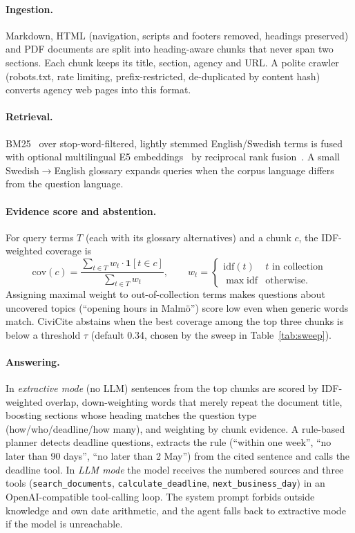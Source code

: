 \documentclass[11pt,a4paper]{article}
\begin{document}
\paragraph{Ingestion.} Markdown, HTML (navigation, scripts and footers removed, headings preserved) and PDF
documents are split into heading-aware chunks that never span two sections. Each chunk keeps its title,
section, agency and URL. A polite crawler (robots.txt, rate limiting, prefix-restricted, de-duplicated by
content hash) converts agency web pages into this format.

\paragraph{Retrieval.} BM25~\cite{bm25} over stop-word-filtered, lightly stemmed English/Swedish terms
is fused with optional multilingual E5 embeddings~\cite{e5} by reciprocal rank fusion~\cite{rrf}. A small
Swedish$\to$English glossary expands queries when the corpus language differs from the question language.

\paragraph{Evidence score and abstention.} For query terms $T$ (each with its glossary alternatives) and a
chunk $c$, the IDF-weighted coverage is
\[
  \mathrm{cov}(c) = \frac{\sum_{t \in T} w_t \cdot \mathbf{1}[t \in c]}{\sum_{t \in T} w_t}, \qquad
  w_t = \begin{cases} \mathrm{idf}(t) & t \text{ in collection} \\ \max \mathrm{idf} & \text{otherwise.} \end{cases}
\]
Assigning maximal weight to out-of-collection terms makes questions about uncovered topics (``opening hours in
Malmö'') score low even when generic words match. CiviCite abstains when the best coverage among the top three
chunks is below a threshold $\tau$ (default 0.34, chosen by the sweep in Table~\ref{tab:sweep}).

\paragraph{Answering.} In \emph{extractive mode} (no LLM) sentences from the top chunks are scored by
IDF-weighted overlap, down-weighting words that merely repeat the document title, boosting sections whose
heading matches the question type (how/who/deadline/how many), and weighting by chunk evidence. A rule-based
planner detects deadline questions, extracts the rule (``within one week'', ``no later than 90 days'',
``no later than 2 May'') from the cited sentence and calls the deadline tool. In \emph{LLM mode} the model
receives the numbered sources and three tools (\texttt{search\_documents}, \texttt{calculate\_deadline},
\texttt{next\_business\_day}) in an OpenAI-compatible tool-calling loop. The system prompt forbids outside
knowledge and own date arithmetic, and the agent falls back to extractive mode if the model is unreachable.
\end{document}
